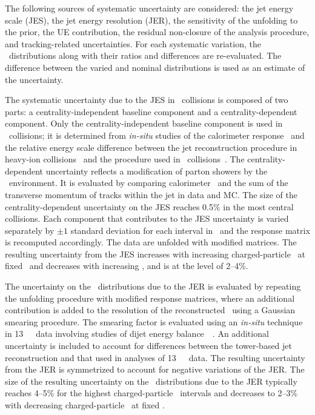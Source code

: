 
The following sources of systematic uncertainty are considered:
the jet energy scale (JES), the jet energy resolution (JER), 
the sensitivity of the  unfolding to the prior, the UE contribution, the residual non-closure of the analysis procedure, and tracking-related uncertainties.
For each systematic variation, the \Dptr\ distributions along with their ratios and differences are re-evaluated. The difference between the varied and nominal distributions is used as an estimate of the uncertainty.

The systematic uncertainty due to the JES in \PbPb\ collisions is composed of two parts: 
a centrality-independent baseline component and a centrality-dependent component. Only the centrality-independent baseline component is used in \pp\ collisions; 
it is determined from \textit{in-situ} studies of the calorimeter
response~\cite{Aad:2011he,HIjesnote,Aaboud:2017jcu} and the relative energy scale difference between the jet reconstruction procedure in heavy-ion collisions~\cite{HIjesnote} and the procedure used in \pp\ collisions~\cite{Aad:2014bia}. The centrality-dependent uncertainty reflects a modification of parton showers by the \PbPb\ environment. It is evaluated by comparing calorimeter \ptjet\ and the sum of the transverse momentum of tracks within the jet in data and MC. The size of the centrality-dependent uncertainty on the JES reaches 0.5\% in the most central collisions. Each component that contributes to the JES uncertainty is varied separately by $\pm1$ standard deviation for each interval in \ptjet\ and the response matrix is recomputed accordingly. The data are unfolded with modified matrices. The resulting uncertainty from the JES increases with increasing charged-particle \pT\ at fixed \ptjet\ and decreases with increasing \ptjet, and is at the level of 2--4\%.

The uncertainty on the \Dptr\ distributions due to the JER is evaluated by repeating the unfolding procedure with modified response matrices, where an additional contribution is added to the resolution of the reconstructed \ptjet\ using a Gaussian smearing procedure. The smearing factor is evaluated using an \textit{in-situ} technique in 13~\TeV\ \pp\ data involving studies of dijet energy balance~~\cite{Aad:2012ag,JERConfNote}. An additional uncertainty is included to account for differences between the tower-based jet reconstruction and that used in analyses of 13~\TeV\ \pp\ data. The resulting uncertainty from the JER is symmetrized to account for negative variations of the JER.  The size of the resulting uncertainty on the \Dptr\ distributions due to the JER typically reaches 4--5\% for the highest charged-particle \pT\ intervals and decreases to 2--3\% with decreasing charged-particle \pT\ at fixed \ptjet.


